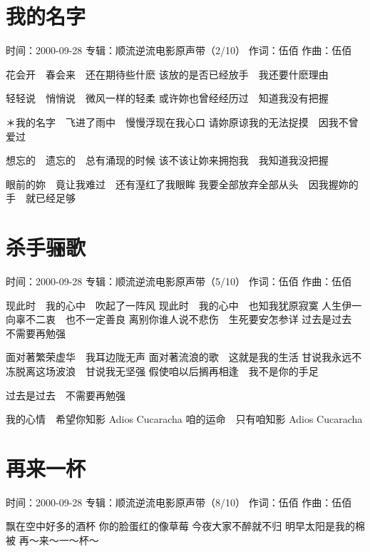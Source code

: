 \documentclass[UTF8,a4paper,oneside,twocolumn,12pt]{ctexbook}
\newcommand{\infopair}[2]{\textbullet #1：#2}
\newcommand{\zc}[1][伍佰]{\infopair{作词}{#1}}
\newcommand{\zq}[1][伍佰]{\infopair{作曲}{#1}}
\newcommand{\zj}[1]{\infopair{专辑}{#1}}
\newcommand{\sj}[1]{\infopair{时间}{#1}}
\newenvironment{info}{\begin{flushleft}\kaishu
	}
	{\end{flushleft}\normalsize\yahei\par}
\newenvironment{lyric}{
	}
{}
\begin{document}
\section{我的名字}
\begin{info}
	\sj{2000-09-28}
	\zj{顺流逆流电影原声带（2/10）}
	\zc
	\zq
\end{info}
\begin{lyric}
	花会开　春会来　还在期待些什麽
	该放的是否已经放手　我还要什麽理由

	轻轻说　悄悄说　微风一样的轻柔
	或许妳也曾经经历过　知道我没有把握

	＊我的名字　飞进了雨中　慢慢浮现在我心口
	请妳原谅我的无法捉摸　因我不曾爱过

	想忘的　遗忘的　总有涌现的时候
	该不该让妳来拥抱我　我知道我没把握

	眼前的妳　竟让我难过　还有溼红了我眼眸
	我要全部放弃全部从头　因我握妳的手　就已经足够
\end{lyric}

\section{杀手骊歌}
\begin{info}
	\sj{2000-09-28}
	\zj{顺流逆流电影原声带（5/10）}
	\zc
	\zq
\end{info}
\begin{lyric}
	现此时　我的心中　吹起了一阵风
	现此时　我的心中　也知我犹原寂寞
	人生伊一向辜不二衷　也不一定善良
	离别你谁人说不悲伤　生死要安怎参详
	过去是过去　不需要再勉强

	面对著繁荣虚华　我耳边陇无声
	面对著流浪的歌　这就是我的生活
	甘说我永远不冻脱离这场波浪　甘说我无坚强
	假使咱以后搁再相逢　我不是你的手足

	过去是过去　不需要再勉强

	我的心情　希望你知影 Adios Cucaracha
	咱的运命　只有咱知影 Adios Cucaracha
\end{lyric}

\section{再来一杯}
\begin{info}
	\sj{2000-09-28}
	\zj{顺流逆流电影原声带（8/10）}
	\zc
	\zq
\end{info}
\begin{lyric}
	飘在空中好多的酒杯
	你的脸蛋红的像草莓
	今夜大家不醉就不归
	明早太阳是我的棉被
	再～来～一～杯～
\end{lyric}
\end{document}
